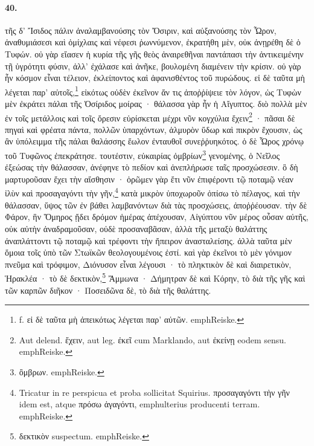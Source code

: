 \documentclass[a4paper, 11pt, oneside, polutonikogreek, german]{article}
\begin{document}
\paragraph{40.}
τῆς δ' Ἴσιδος πάλιν ἀναλαμβανούσης τὸν Ὄσιριν, καὶ αὐξανούσης τὸν Ὧρον, ἀναθυμιάσεσι καὶ ὁμίχλαις καὶ νέφεσι ῥωννύμενον, ἐκρατήθη μὲν, οὐκ ἀνῃρέθη δὲ ὁ Τυφών. οὐ γὰρ εἴασεν ἡ κυρία τῆς γῆς θεὸς ἀναιρεθῆναι παντάπασι τὴν ἀντικειμένην τῇ ὑγρότητι φύσιν, ἀλλ' ἐχάλασε καὶ ἀνῆκε, βουλομένη διαμένειν τὴν κρίσιν. οὐ γὰρ ἦν κόσμον εἶναι τέλειον, ἐκλείποντος καὶ ἀφανισθέντος τοῦ πυρώδους. εἰ δὲ ταῦτα μὴ λέγεται παρ' αὐτοῖς,\footnote{f. εἰ δὲ ταῦτα μὴ ἀπεικότως λέγεται παρ' αὐτῶν. emph{Reiske.}} εἰκότως οὐδὲν ἐκεῖνον ἄν τις ἀποῤῥίψειε τὸν λόγον, ὡς Τυφὼν μὲν ἐκράτει πάλαι τῆς Ὀσίριδος μοίρας · θάλασσα γὰρ ἦν ἡ Αἴγυπτος. διὸ πολλὰ μὲν ἐν τοῖς μετάλλοις καὶ τοῖς ὄρεσιν εὑρίσκεται μέχρι νῦν κογχύλια ἔχειν\footnote{Aut delend. ἔχειν, aut leg. ἐκεῖ cum Marklando, aut ἐκείνῃ eodem sensu. emph{Reiske.}} · πᾶσαι δὲ πηγαὶ καὶ φρέατα πάντα, πολλῶν ὑπαρχόντων, ἁλμυρὸν ὕδωρ καὶ πικρὸν ἔχουσιν, ὡς ἂν ὑπόλειμμα τῆς πάλαι θαλάσσης ἕωλον ἐνταυθοῖ συνεῤῥυηκότος. ὁ δὲ Ὧρος χρόνῳ τοῦ Τυφῶνος ἐπεκράτησε. τουτέστιν, εὐκαιρίας ὀμβρίων\footnote{ὂμβρων. emph{Reiske.}} γενομένης, ὁ Νεῖλος ἐξεώσας τὴν θάλασσαν, ἀνέφηνε τὸ πεδίον καὶ ἀνεπλήρωσε ταῖς προσχώσεσιν. ὃ δὴ μαρτυροῦσαν ἔχει τὴν αἴσθησιν · ὁρῶμεν γὰρ ἔτι νῦν ἐπιφέροντι τῷ ποταμῷ νέαν ἰλὺν καὶ προσαγαγόντι τὴν γῆν,\footnote{Tricatur in re perspicua et proba sollicitat Squirius. προσαγαγόντι τὴν γῆν idem est, atque πρόσω ἀγαγόντι, emph{ulterius producenti terram}. emph{Reiske.}} κατὰ μικρὸν ὑποχωροῦν ὀπίσω τὸ πέλαγος, καὶ τὴν θάλασσαν, ὕψος τῶν ἐν βάθει λαμβανόντων διὰ τὰς προσχώσεις, ἀποῤῥέουσαν. τὴν δὲ Φάρον, ἣν Ὅμηρος ᾔδει δρόμον ἡμέρας ἀπέχουσαν, Αἰγύπτου νῦν μέρος οὖσαν αὐτῆς, οὐκ αὐτὴν ἀναδραμοῦσαν, οὐδὲ προσαναβᾶσαν, ἀλλὰ τῆς μεταξὺ θαλάττης ἀναπλάττοντι τῷ ποταμῷ καὶ τρέφοντι τὴν ἤπειρον ἀνασταλείσης. ἀλλὰ ταῦτα μὲν ὅμοια τοῖς ὑπὸ τῶν Στωϊκῶν θεολογουμένοις ἐστί. καὶ γὰρ ἐκεῖνοι τὸ μὲν γόνιμον πνεῦμα καὶ τρόφιμον, Διόνυσον εἶναι λέγουσι · τὸ πληκτικὸν δὲ καὶ διαιρετικὸν, Ἡρακλέα · τὸ δὲ δεκτικὸν,\footnote{δεκτικὸν suspectum. emph{Reiske.}} Ἄμμωνα · Δήμητραν δὲ καὶ Κόρην, τὸ διὰ τῆς γῆς καὶ τῶν καρπῶν διῆκον · Ποσειδῶνα δὲ, τὸ διὰ τῆς θαλάττης.
\end{document}
